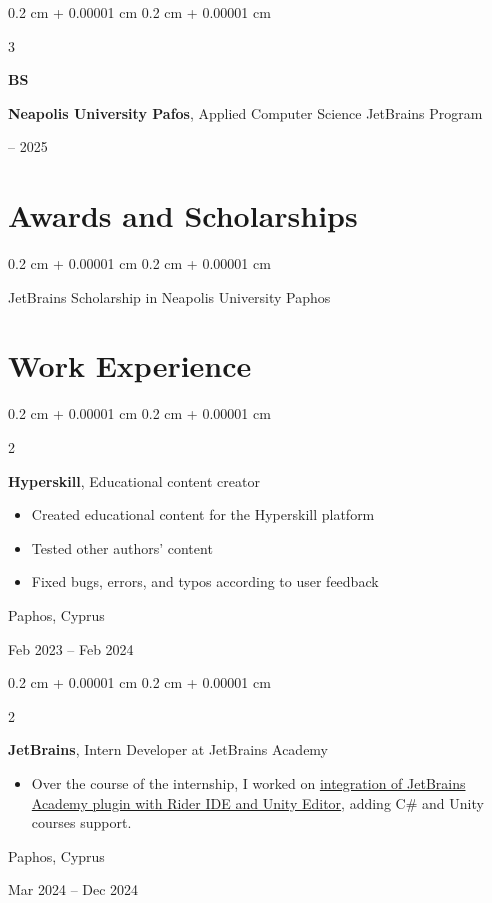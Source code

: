 \documentclass[10pt, letterpaper]{article}
\newenvironment{highlights}{
    \begin{itemize}[
        topsep=0.10 cm,
        parsep=0.10 cm,
        partopsep=0pt,
        itemsep=0pt,
        leftmargin=0.4 cm + 10pt
    ]
}{
    \end{itemize}
} %
\newenvironment{onecolentry}{
    \begin{adjustwidth}{
        0.2 cm + 0.00001 cm
    }{
        0.2 cm + 0.00001 cm
    }
}{
    \end{adjustwidth}
} %
\newenvironment{twocolentry}[2][]{
    \onecolentry
    \def\secondColumn{#2}
    \setcolumnwidth{\fill, 4.5 cm}
    \begin{paracol}{2}
}{
    \switchcolumn \raggedleft \secondColumn
    \end{paracol}
    \endonecolentry
} %
\newenvironment{threecolentry}[3][]{
    \onecolentry
    \def\thirdColumn{#3}
    \setcolumnwidth{1 cm, \fill, 4.5 cm}
    \begin{paracol}{3}
    {\raggedright #2} \switchcolumn
}{
    \switchcolumn \raggedleft \thirdColumn
    \end{paracol}
    \endonecolentry
} %
\begin{document}
        \begin{threecolentry}{\textbf{BS}}{
            2023 – 2025
        }
            \textbf{Neapolis University Pafos}, Applied Computer Science JetBrains Program
        \end{threecolentry}


    
    \section{Awards and Scholarships}



        
        \begin{onecolentry}
            JetBrains Scholarship in Neapolis University Paphos
        \end{onecolentry}


    
    \section{Work Experience}



        
        \begin{twocolentry}{
            Paphos, Cyprus

        Feb 2023 – Feb 2024
        }
            \textbf{Hyperskill}, Educational content creator
            \begin{highlights}
                \item Created educational content for the Hyperskill platform
                \item Tested other authors' content
                \item Fixed bugs, errors, and typos according to user feedback
            \end{highlights}
        \end{twocolentry}


        \vspace{0.2 cm}

        \begin{twocolentry}{
            Paphos, Cyprus

        Mar 2024 – Dec 2024
        }
            \textbf{JetBrains}, Intern Developer at JetBrains Academy
            \begin{highlights}
                \item Over the course of the internship, I worked on \href{https://drive.google.com/file/d/1WoW1RgmzC_QNE1PJSZ3Bqexz9DNVAvin/view?usp=sharing}{integration of JetBrains Academy plugin with Rider IDE and Unity Editor}, adding C\# and Unity courses support.
            \end{highlights}
        \end{twocolentry}
\end{document}
